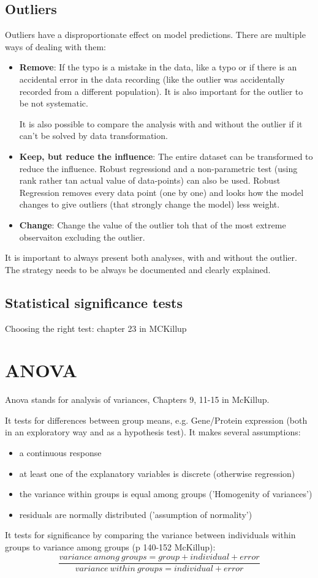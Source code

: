 \documentclass{article}
\begin{document}
\subsection{Outliers}
Outliers have a disproportionate effect on model predictions. There are multiple ways of dealing with them:
\begin{itemize}
    \item \textbf{Remove}: If the typo is a mistake in the data, like a typo or if there is an accidental error in the data recording (like the outlier was accidentally recorded from a different population). It is also important for the outlier to be not systematic. \par 
    It is also possible to compare the analysis with and without the outlier if it can't be solved by data transformation.
    \item \textbf{Keep, but reduce the influence}: The entire dataset can be transformed to reduce the influence. Robust regressiond and a non-parametric test (using rank rather tan actual value of data-points) can also be used. Robust Regression removes every data point (one by one) and looks how the model changes to give outliers (that strongly change the model) less weight.
    \item \textbf{Change}: Change the value of the outlier toh that of the most extreme observaiton excluding the outlier.
\end{itemize}
It is important to always present both analyses, with and without the outlier. The strategy needs to be always be documented and clearly explained.

\subsection{Statistical significance tests}
Choosing the right test: chapter 23 in MCKillup


\section{ANOVA}
Anova stands for analysis of variances, Chapters 9, 11-15 in McKillup.\par 
It tests for differences between group means, e.g. Gene/Protein expression (both in an exploratory way and as a hypothesis test). It makes several assumptions:
\begin{itemize}
    \item a continuous response
    \item at least one of the explanatory variables is discrete (otherwise regression)
    \item the variance within groups is equal among groups ('Homogenity of variances')
    \item residuals are normally distributed ('assumption of normality')
\end{itemize}
It tests for significance by comparing the variance between individuals within groups to variance among groups (p 140-152 McKillup):
\begin{equation}\label{fvalue}
   \frac{variance \: among \: groups = group+individual+error}{variance\: within\: groups = individual+error}
\end{equation}
\end{document}
